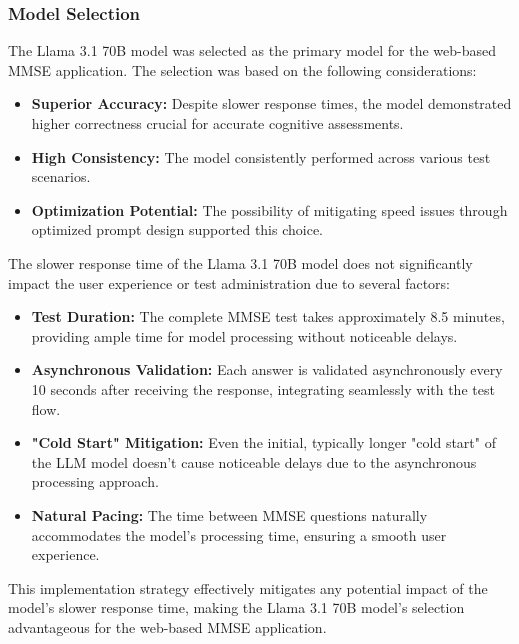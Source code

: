 \subsubsection{Model Selection}
The Llama 3.1 70B model was selected as the primary model for the web-based MMSE application. The selection was based on the following considerations:

\begin{itemize}
    \item \textbf{Superior Accuracy:} Despite slower response times, the model demonstrated higher correctness crucial for accurate cognitive assessments.
    
    \item \textbf{High Consistency:} The model consistently performed across various test scenarios.
    
    \item \textbf{Optimization Potential:} The possibility of mitigating speed issues through optimized prompt design supported this choice.
\end{itemize}

The slower response time of the Llama 3.1 70B model does not significantly impact the user experience or test administration due to several factors:

\begin{itemize}
    \item \textbf{Test Duration:} The complete MMSE test takes approximately 8.5 minutes, providing ample time for model processing without noticeable delays.
    
    \item \textbf{Asynchronous Validation:} Each answer is validated asynchronously every 10 seconds after receiving the response, integrating seamlessly with the test flow.
    
    \item \textbf{"Cold Start" Mitigation:} Even the initial, typically longer "cold start" of the LLM model doesn't cause noticeable delays due to the asynchronous processing approach.
    
    \item \textbf{Natural Pacing:} The time between MMSE questions naturally accommodates the model's processing time, ensuring a smooth user experience.
\end{itemize}

This implementation strategy effectively mitigates any potential impact of the model's slower response time, making the Llama 3.1 70B model's selection advantageous for the web-based MMSE application.

